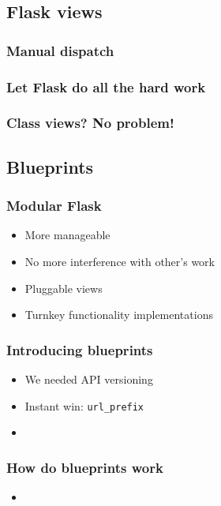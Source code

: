 \documentclass{beamer}
\begin{document}
\subsection{Flask views}

\begin{frame}
  \frametitle{Manual dispatch}
  
\end{frame}

\begin{frame}
  \frametitle{Let Flask do all the hard work}
  
\end{frame}

\begin{frame}
  \frametitle{Class views? No problem!}
  
\end{frame}

\subsection{Blueprints}

\begin{frame}
  \frametitle{Modular Flask}
  \begin{itemize}
  \item More manageable
  \item No more interference with other's work
  \item Pluggable views
  \item Turnkey functionality implementations
  \end{itemize}
\end{frame}

\begin{frame}
  \frametitle{Introducing blueprints}
  \begin{itemize}
  \item We needed API versioning
  \item Instant win: \texttt{url\_prefix}
  \item
  \end{itemize}
\end{frame}

\begin{frame}
  \frametitle{How do blueprints work}
  \begin{itemize}
  \item
  \end{itemize}

\end{frame}
\end{document}
